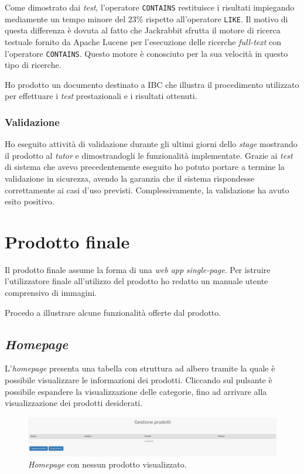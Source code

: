 	Come dimostrato dai \textit{test}, l'operatore \texttt{CONTAINS} restituisce i risultati impiegando mediamente un tempo minore del 23\% rispetto all'operatore \texttt{LIKE}. Il motivo di questa differenza è dovuta al fatto che Jackrabbit sfrutta il motore di ricerca testuale fornito da Apache Lucene per l'esecuzione delle ricerche \textit{full-text} con l'operatore \texttt{CONTAINS}. Questo motore è conosciuto per la sua velocità in questo tipo di ricerche.
	
	Ho prodotto un documento destinato a IBC che illustra il procedimento utilizzato per effettuare i \textit{test} prestazionali e i risultati ottenuti.
	
	\subsubsection{Validazione}
	
	Ho eseguito attività di validazione durante gli ultimi giorni dello \textit{stage} mostrando il prodotto al \textit{tutor} e dimostrandogli le funzionalità implementate. Grazie ai \textit{test} di sistema che avevo precedentemente eseguito ho potuto portare a termine la validazione in sicurezza, avendo la garanzia che il sistema rispondesse correttamente ai casi d'uso previsti. Complessivamente, la validazione ha avuto esito positivo.

\section{Prodotto finale}
	Il prodotto finale assume la forma di una \textit{web app} \textit{single-page}. Per istruire l'utilizzatore finale all'utilizzo del prodotto ho redatto un manuale utente comprensivo di immagini. 
	
	Procedo a illustrare alcune funzionalità offerte dal prodotto.
	
	\subsection{\textit{Homepage}}
		L'\textit{homepage} presenta una tabella con struttura ad albero tramite la quale è possibile visualizzare le informazioni dei prodotti. Cliccando sul pulsante \jquote{+} è possibile espandere la visualizzazione delle categorie, fino ad arrivare alla visualizzazione dei prodotti desiderati.
		
		\begin{figure}[H]
			\centering
			\includegraphics[width=\textwidth]{immagini/home-page-blank}
			\caption{\textit{Homepage} con nessun prodotto visualizzato.}
		\end{figure}
	
